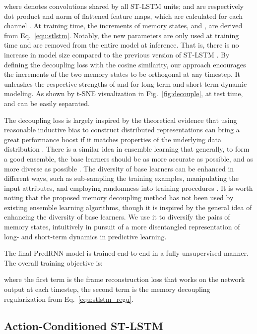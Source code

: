\documentclass[10pt,journal,compsoc]{IEEEtran}
\newcommand{\eqn}[1]{Eq.~\eqref{#1}}
\newcommand{\fig}[1]{Fig.~\ref{#1}}
\begin{document}
where  denotes  convolutions shared by all ST-LSTM units;  and  are respectively dot product and  norm of flattened feature maps, which are calculated for each channel .
At training time, the increments of memory states,  and , are derived from \eqn{equ:stlstm}.
Notably, the new parameters are only used at training time and are removed from the entire model at inference. That is, there is no increase in model size compared to the previous version of ST-LSTM \cite{wang2017predrnn}.
By defining the decoupling loss with the cosine similarity, our approach encourages the increments of the two memory states to be orthogonal at any timestep. It unleashes the respective strengths of  and  for long-term and short-term dynamic modeling.
As shown by t-SNE visualization in \fig{fig:decouple}, at test time,  and  can be easily separated.


The decoupling loss is largely inspired by the theoretical evidence that using reasonable inductive bias to construct distributed representations can bring a great performance boost if it matches properties of the underlying data distribution \cite{pascanu2013number}.
There is a similar idea in ensemble learning that generally, to form a good ensemble, the base learners should be as more accurate as possible, and as more diverse as possible \cite{krogh1995neural}. 
The diversity of base learners can be enhanced in different ways, such as sub-sampling the training examples, manipulating the input attributes, and employing randomness into training procedures \cite{zhou2009ensemble}. 
It is worth noting that the proposed memory decoupling method has not been used by existing ensemble learning algorithms, though it is inspired by the general idea of enhancing the diversity of base learners. 
We use it to diversify the pairs of memory states, intuitively in pursuit of a more disentangled representation of long- and short-term dynamics in predictive learning. 

The final PredRNN model is trained end-to-end in a fully unsupervised manner. The overall training objective is:
 
where the first term is the frame reconstruction loss that works on the network output at each timestep, the second term is the memory decoupling regularization from \eqn{equ:stlstm_regu}.



\subsection{Action-Conditioned ST-LSTM}
\end{document}
